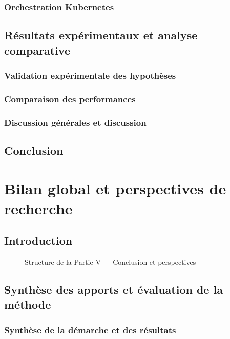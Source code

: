 \documentclass[ twoside,openright,titlepage,numbers=noenddot,headinclude,%
                footinclude=true,cleardoublepage=empty,abstractoff, %
                BCOR=5mm,paper=a4,fontsize=11pt,%
                french,american,%
                ]{scrreprt}
\begin{document}
\section{Orchestration Kubernetes}

\chapter{Résultats expérimentaux et analyse comparative}
\section{Validation expérimentale des hypothèses}
\section{Comparaison des performances}
\section{Discussion générales et discussion}

\chapter*{Conclusion}


\part{Bilan global et perspectives de recherche}

\chapter*{Introduction}


\begin{figure}[h!]
    \centering
    
    \caption{Structure de la Partie V — Conclusion et perspectives}
\end{figure}

\chapter{Synthèse des apports et évaluation de la méthode}

\section{Synthèse de la démarche et des résultats}
\end{document}
